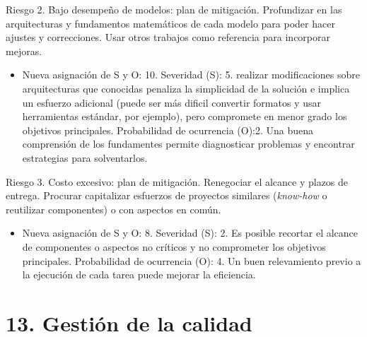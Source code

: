\documentclass[11pt]{charter}
\begin{document}
Riesgo 2. Bajo desempeño de modelos: plan de mitigación. Profundizar en las arquitecturas y fundamentos matemáticos de cada modelo para poder hacer ajustes y correcciones. Usar otros trabajos como referencia para incorporar mejoras. 
\begin{itemize}
	\item Nueva asignación de S y O: 10.
	\subitem Severidad (S): 5. realizar modificaciones sobre arquitecturas que conocidas penaliza la simplicidad de la solución e implica un esfuerzo adicional (puede ser más dificil convertir formatos y usar herramientas estándar, por ejemplo), pero compromete en menor grado los objetivos principales.
	\subitem Probabilidad de ocurrencia (O):2. Una buena comprensión de los fundamentes permite diagnosticar problemas y encontrar estrategias para solventarlos.
\end{itemize}

Riesgo 3. Costo excesivo: plan de mitigación. Renegociar el alcance y plazos de entrega. Procurar capitalizar esfuerzos de proyectos similares ({\em know-how} o reutilizar componentes) o con aspectos en común.
\begin{itemize}
	\item Nueva asignación de S y O: 8.
	\subitem Severidad (S): 2. Es posible recortar el alcance de componentes o aspectos no críticos y no comprometer los objetivos principales.
	\subitem Probabilidad de ocurrencia (O): 4. Un buen relevamiento previo a la ejecución de cada tarea puede mejorar la eficiencia.
\end{itemize}

\section{13. Gestión de la calidad}
\label{sec:calidad}
\end{document}
